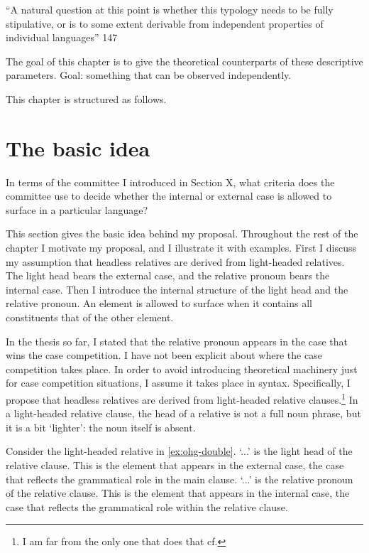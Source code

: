 ``A natural question at this point is whether this typology needs to be fully stipulative, or is to some extent derivable from independent properties of individual languages'' \citet{grosu1994}{147}

The goal of this chapter is to give the theoretical counterparts of these descriptive parameters. Goal: something that can be observed independently.

This chapter is structured as follows.


\section{The basic idea}\label{sec:basic-idea}

In terms of the committee I introduced in Section X, what criteria does the committee use to decide whether the internal or external case is allowed to surface in a particular language?

This section gives the basic idea behind my proposal. Throughout the rest of the chapter I motivate my proposal, and I illustrate it with examples. First I discuss my assumption that headless relatives are derived from light-headed relatives. The light head bears the external case, and the relative pronoun bears the internal case. Then I introduce the internal structure of the light head and the relative pronoun. An element is allowed to surface when it contains all constituents that of the other element.

In the thesis so far, I stated that the relative pronoun appears in the case that wins the case competition. I have not been explicit about where the case competition takes place. In order to avoid introducing theoretical machinery just for case competition situations, I assume it takes place in syntax.
Specifically, I propose that headless relatives are derived from light-headed relative clauses.\footnote{
I am far from the only one that does that cf.
} In a light-headed relative clause, the head of a relative is not a full noun phrase, but it is a bit `lighter': the noun itself is absent.

Consider the light-headed relative in \ref{ex:ohg-double}.
 `...' is the light head of the relative clause. This is the element that appears in the external case, the case that reflects the grammatical role in the main clause.
 `...' is the relative pronoun of the relative clause. This is the element that appears in the internal case, the case that reflects the grammatical role within the relative clause.

